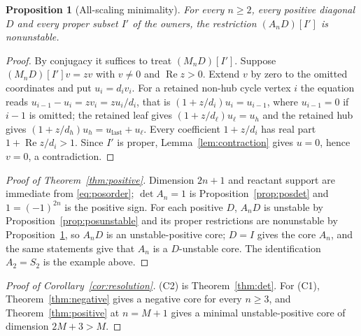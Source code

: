 \documentclass[11pt,a4paper]{article}
\theoremstyle{plain}
\newtheorem{proposition}[theorem]{Proposition}
\theoremstyle{definition}
\theoremstyle{remark}
\DeclareMathOperator{\Ree}{Re}
\begin{document}
\begin{proposition}[All-scaling minimality]\label{prop:allrate}
For every $n\ge2$, every positive diagonal $D$ and every proper subset $I'$ of the owners, the restriction $(A_nD)[I']$ is nonunstable.
\end{proposition}
\begin{proof}
By conjugacy it suffices to treat $(M_nD)[I']$. Suppose $(M_nD)[I']v=zv$ with $v\ne0$ and $\Ree z>0$. Extend $v$ by zero to the omitted coordinates and put $u_i=d_iv_i$. For a retained non-hub cycle vertex $i$ the equation reads $u_{i-1}-u_i=zv_i=zu_i/d_i$, that is $(1+z/d_i)u_i=u_{i-1}$, where $u_{i-1}=0$ if $i-1$ is omitted; the retained leaf gives $(1+z/d_\ell)u_\ell=u_h$ and the retained hub gives $(1+z/d_h)u_h=u_{\text{last}}+u_\ell$. Every coefficient $1+z/d_i$ has real part $1+\Ree z/d_i>1$. Since $I'$ is proper, Lemma~\ref{lem:contraction} gives $u=0$, hence $v=0$, a contradiction.
\end{proof}

\begin{proof}[Proof of Theorem~\ref{thm:positive}]
Dimension $2n+1$ and reactant support are immediate from \eqref{eq:posorder}; $\det A_n=1$ is Proposition~\ref{prop:posdet} and $1=(-1)^{2n}$ is the positive sign. For each positive $D$, $A_nD$ is unstable by Proposition~\ref{prop:posunstable} and its proper restrictions are nonunstable by Proposition~\ref{prop:allrate}, so $A_nD$ is an unstable-positive core; $D=I$ gives the core $A_n$, and the same statements give that $A_n$ is a $D$-unstable core. The identification $A_2=S_2$ is the example above.
\end{proof}

\begin{proof}[Proof of Corollary~\ref{cor:resolution}]
(C2) is Theorem~\ref{thm:det}. For (C1), Theorem~\ref{thm:negative} gives a negative core for every $n\ge3$, and Theorem~\ref{thm:positive} at $n=M+1$ gives a minimal unstable-positive core of dimension $2M+3>M$.
\end{proof}
\end{document}
